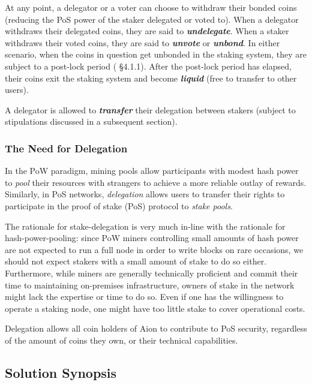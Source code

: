 At any point, a delegator or a voter can choose to withdraw their bonded coins (reducing the PoS power of the staker delegated or voted to). When a delegator withdraws their delegated coins, they are said to \textbf{\textit{undelegate}}. When a staker withdraws their voted coins, they are said to \textbf{\textit{unvote}} or \textbf{\textit{unbond}}. In either scenario, when the coins in question get unbonded in the staking system, they are subject to a post-lock period (\cite{WZS19} \S4.1.1). After the post-lock period has elapsed, their coins exit the staking system and become \textbf{\textit{liquid}} (free to transfer to other users). 

A delegator is allowed to \textbf{\textit{transfer}} their delegation between stakers (subject to stipulations discussed in a subsequent section). 

\subsubsection{The Need for Delegation} \label{delegation_overview}
In the PoW paradigm, mining pools allow participants with modest hash power to \textit{pool} their resources with strangers to achieve a more reliable outlay of rewards. Similarly, in PoS networks, \textit{delegation} allows users to transfer their rights to participate in the proof of stake (PoS) protocol to \textit{stake pools}. 

The rationale for stake-delegation is very much in-line with the rationale for hash-power-pooling: since PoW miners controlling small amounts of hash power are not expected to run a full node in order to write blocks on rare occasions, we should not expect stakers with a small amount of stake to do so either. Furthermore, while miners are generally technically proficient and commit their time to maintaining on-premises infrastructure, owners of stake in the network might lack the expertise or time to do so. Even if one has the willingness to operate a staking node, one might have too little stake to cover operational costs. 

Delegation allows all coin holders of Aion to contribute to PoS security, regardless of the amount of coins they own, or their technical capabilities.

\subsection{Solution Synopsis}

